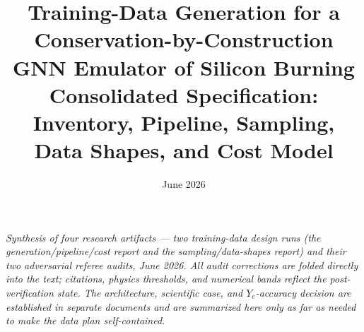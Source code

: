 \documentclass[11pt]{article}
\title{Training-Data Generation for a Conservation-by-Construction GNN Emulator of Silicon Burning\\[6pt]
\large Consolidated Specification: Inventory, Pipeline, Sampling, Data Shapes, and Cost Model}
\author{}
\date{June 2026}
\newcommand{\Ye}{\ensuremath{Y_e}}
\begin{document}
\maketitle
\vspace{-1.5em}
{\centering\small\itshape Synthesis of four research artifacts --- two training-data design runs (the generation/pipeline/cost report and the sampling/data-shapes report) and their two adversarial referee audits, June 2026. All audit corrections are folded directly into the text; citations, physics thresholds, and numerical bands reflect the post-verification state. The architecture, scientific case, and \Ye{}-accuracy decision are established in separate documents and are summarized here only as far as needed to make the data plan self-contained.\par}
\medskip
\end{document}
